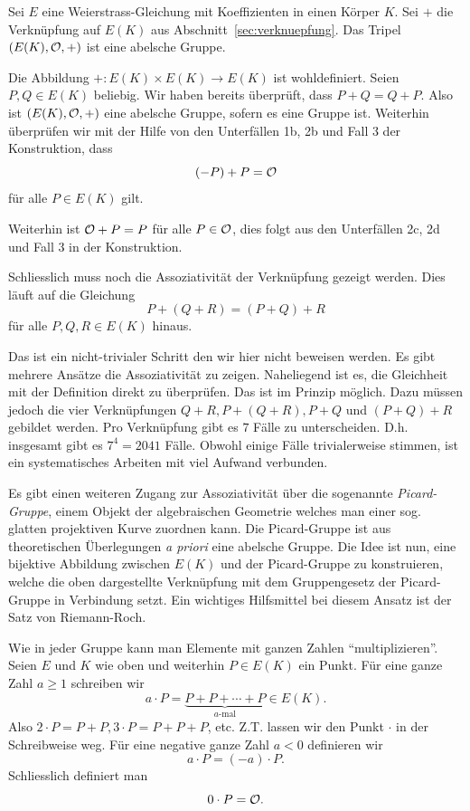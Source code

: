 \begin{satz}
  Sei $E$ eine Weierstrass-Gleichung mit Koeffizienten in einen Körper
  $K$. Sei $+$ die Verknüpfung auf $E(K)$ aus
  Abschnitt~\ref{sec:verknuepfung}.
  Das Tripel $(E(K),{\mathcal O},+)$ ist eine abelsche Gruppe. 
\end{satz}

Die Abbildung $+\colon E(K)\times E(K) \rightarrow E(K)$ ist
wohldefiniert. Seien $P,Q\in E(K)$ beliebig.
Wir haben bereits überprüft, dass $P+Q=Q+P$. Also ist
$(E(K),{\mathcal O},+)$  eine abelsche Gruppe, sofern es eine Gruppe ist. 
Weiterhin überprüfen wir mit der Hilfe von den  Unterfällen
1b, 2b und Fall 3 der Konstruktion, dass
$$  (-P)+P = {\mathcal O}$$
für alle $P\in E(K)$ gilt.

Weiterhin ist ${\mathcal O} + P = P $ für alle $P\in {\mathcal O}$, dies folgt aus den
Unterfällen 2c, 2d und Fall 3 in der Konstruktion. 

Schliesslich muss noch die Assoziativität der Verknüpfung gezeigt
werden. Dies läuft auf die Gleichung
$$
P + (Q + R) = (P+Q)+R$$
für alle $P,Q,R\in E(K)$ hinaus.

Das ist ein nicht-trivialer Schritt den wir hier nicht beweisen
werden. Es gibt mehrere Ansätze die Assoziativität zu zeigen.
Naheliegend ist es, die Gleichheit mit der Definition direkt zu
überprüfen. Das ist im Prinzip möglich. Dazu müssen jedoch die vier
Verknüpfungen $Q+R, P+(Q+R), P+Q$ und $(P+Q)+R$ gebildet werden.
Pro Verknüpfung gibt es $7$ Fälle zu unterscheiden. D.h. insgesamt gibt
es $7^4= 2041$ Fälle. Obwohl einige Fälle trivialerweise stimmen, ist
ein systematisches Arbeiten mit viel Aufwand verbunden.


Es gibt einen weiteren Zugang zur Assoziativität über die sogenannte
 \emph{Picard-Gruppe}, einem  Objekt der algebraischen Geometrie
 welches man einer sog. glatten projektiven Kurve
 zuordnen kann. Die Picard-Gruppe ist aus theoretischen
Überlegungen \textit{a priori} eine abelsche Gruppe. Die Idee ist nun, eine
bijektive Abbildung zwischen $E(K)$ und der Picard-Gruppe zu
konstruieren, welche die oben dargestellte Verknüpfung mit dem
Gruppengesetz der Picard-Gruppe in Verbindung setzt.
Ein wichtiges Hilfsmittel bei diesem Ansatz ist der Satz von
Riemann-Roch. 

Wie in jeder Gruppe kann man Elemente mit ganzen Zahlen
``multiplizieren''. Seien $E$ und $K$ wie oben und weiterhin $P\in
E(K)$ ein Punkt. Für eine ganze Zahl $a\ge 1$ schreiben wir
\begin{equation}
  \label{eq:amultP}
  a\cdot P = \underbrace{P+ P+\cdots +P}_{\text{$a$-mal}} \in E(K).
\end{equation}
Also $2\cdot P = P+P, 3\cdot P = P+P+P$, etc. Z.T. lassen wir den
Punkt $\cdot$ in der Schreibweise weg. 
Für eine negative ganze Zahl $a<0$ definieren wir
\begin{equation*}
  a\cdot P = (-a) \cdot P. 
\end{equation*}
Schliesslich definiert man
\begin{equation*}
  0\cdot P = {\mathcal O}.
\end{equation*}

